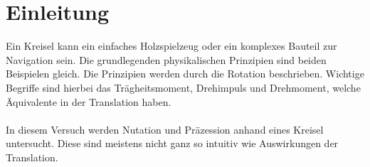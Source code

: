 \chapter{Einleitung}
Ein Kreisel kann ein einfaches Holzspielzeug oder ein komplexes Bauteil zur Navigation sein.
Die grundlegenden physikalischen Prinzipien sind beiden Beispielen gleich.
Die Prinzipien werden durch die Rotation beschrieben.
Wichtige Begriffe sind hierbei das Trägheitsmoment, Drehimpuls und Drehmoment, welche Äquivalente in der Translation haben.\\\\
In diesem Versuch werden Nutation und Präzession anhand eines Kreisel untersucht.
Diese sind meistens nicht ganz so intuitiv wie Auswirkungen der Translation.